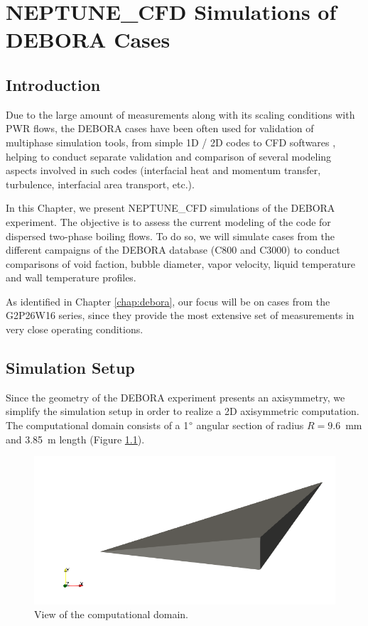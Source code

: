 \chapter{NEPTUNE\_CFD Simulations of DEBORA Cases}
\label{chap:debora_ncfd}

\minitoc

\section{Introduction}

Due to the large amount of measurements along with its scaling conditions with PWR flows, the DEBORA cases have been often used for validation of multiphase simulation tools, from simple 1D / 2D codes \cite{kledy_toward_2021, gueguen_contribution_2013, manon_contribution_2000} to CFD softwares \cite{bestion_review_2008, guelfi_neptune_2007, ruyer_modelisation_2009, montout_contribution_2009, lavieville_generalized_2017}, helping to conduct separate validation and comparison of several modeling aspects involved in such codes (interfacial heat and momentum transfer, turbulence, interfacial area transport, etc.). 

\npar

In this Chapter, we present NEPTUNE\_CFD simulations of the DEBORA experiment. The objective is to assess the current modeling of the code for dispersed two-phase boiling flows. To do so, we will simulate cases from the different campaigns of the DEBORA database (C800 and C3000) to conduct comparisons of void faction, bubble diameter, vapor velocity, liquid temperature and wall temperature profiles.

\npar

As identified in Chapter \ref{chap:debora}, our focus will be on cases from the G2P26W16 series, since they provide the most extensive set of measurements in very close operating conditions.


\section{Simulation Setup}

Since the geometry of the DEBORA experiment presents an axisymmetry, we simplify the simulation setup in order to realize a 2D axisymmetric computation. The computational domain consists of a 1$\degree$ angular section of radius $R=9.6$\ mm and 3.85\ m length (Figure \ref{fig:deb_cfd_domain}).


\begin{figure}[!h]
\centering
\includegraphics[width=0.6\linewidth]{img/DEBORA/cfd/msh/domain.png}
\caption{View of the computational domain.}
\label{fig:deb_cfd_domain}
\end{figure}


